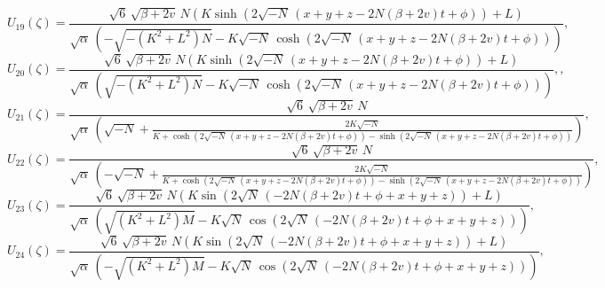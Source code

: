 \documentclass[10pt]{NSP1}
\numberwithin{equation}{section}
\begin{document}
\begin{equation}\label{U19}
    U_{19} \! \left(\zeta \right) =
\frac{\sqrt{6}\, \sqrt{\beta +2 v}\, N \left(K \sinh \! \left(2 \sqrt{-N}\, \left(x +y +z -2 N \left(\beta +2 v \right) t +\phi \right)\right)+L \right)}{\sqrt{\alpha}\, \left(-\sqrt{-\left(K^{2}+L^{2}\right) N}-K \sqrt{-N}\, \cosh \! \left(2 \sqrt{-N}\, \left(x +y +z -2 N \left(\beta +2 v \right) t +\phi \right)\right)\right)},
\end{equation}
\begin{equation}\label{U20}
    U_{20} \! \left(\zeta \right) =
\frac{\sqrt{6}\, \sqrt{\beta +2 v}\, N \left(K \sinh \! \left(2 \sqrt{-N}\, \left(x +y +z -2 N \left(\beta +2 v \right) t +\phi \right)\right)+L \right)}{\sqrt{\alpha}\, \left(\sqrt{-\left(K^{2}+L^{2}\right) N}-K \sqrt{-N}\, \cosh \! \left(2 \sqrt{-N}\, \left(x +y +z -2 N \left(\beta +2 v \right) t +\phi \right)\right)\right)},,
\end{equation}
\begin{equation}\label{U21}
U_{21} \! \left(\zeta \right) =
\frac{\sqrt{6}\, \sqrt{\beta +2 v}\, N}{\sqrt{\alpha}\, \left(\sqrt{-N}+\frac{2 K \sqrt{-N}}{K +\cosh \left(2 \sqrt{-N}\, \left(x +y +z -2 N \left(\beta +2 v \right) t +\phi \right)\right)-\sinh \left(2 \sqrt{-N}\, \left(x +y +z -2 N \left(\beta +2 v \right) t +\phi \right)\right)}\right)},
\end{equation}
\begin{equation}\label{U22}
U_{22} \! \left(\zeta \right) =
\frac{\sqrt{6}\, \sqrt{\beta +2 v}\, N}{\sqrt{\alpha}\, \left(-\sqrt{-N}+\frac{2 K \sqrt{-N}}{K +\cosh \left(2 \sqrt{-N}\, \left(x +y +z -2 N \left(\beta +2 v \right) t +\phi \right)\right)-\sinh \left(2 \sqrt{-N}\, \left(x +y +z -2 N \left(\beta +2 v \right) t +\phi \right)\right)}\right)},
\end{equation}
\begin{equation}\label{U23}
U_{23} \! \left(\zeta \right) =
\frac{\sqrt{6}\, \sqrt{\beta +2 v}\, N \left(K \sin \! \left(2 \sqrt{N}\, \left(-2 N \left(\beta +2 v \right) t +\phi +x +y +z \right)\right)+L \right)}{\sqrt{\alpha}\, \left(\sqrt{\left(K^{2}+L^{2}\right) M}-K \sqrt{N}\, \cos \! \left(2 \sqrt{N}\, \left(-2 N \left(\beta +2 v \right) t +\phi +x +y +z \right)\right)\right)},
\end{equation}
\begin{equation}\label{U24}
U_{24} \! \left(\zeta \right) =
\frac{\sqrt{6}\, \sqrt{\beta +2 v}\, N \left(K \sin \! \left(2 \sqrt{N}\, \left(-2 N \left(\beta +2 v \right) t +\phi +x +y +z \right)\right)+L \right)}{\sqrt{\alpha}\, \left(-\sqrt{\left(K^{2}+L^{2}\right) M}-K \sqrt{N}\, \cos \! \left(2 \sqrt{N}\, \left(-2 N \left(\beta +2 v \right) t +\phi +x +y +z \right)\right)\right)},
\end{equation}
\end{document}
